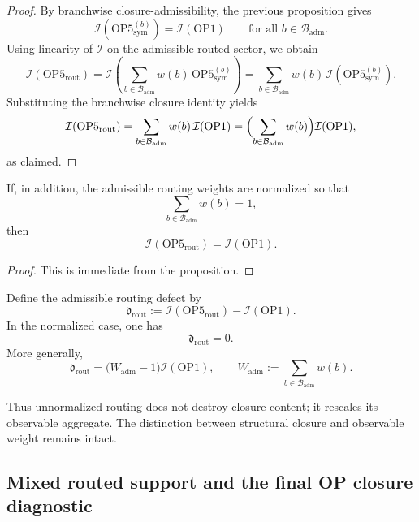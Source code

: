 \begin{proof}
By branchwise closure-admissibility, the previous proposition gives
\[
\mathcal{I}\!\left(\mathrm{OP5}^{(b)}_{\mathrm{sym}}\right)
=
\mathcal{I}(\mathrm{OP1})
\qquad
\text{for all } b\in\mathcal{B}_{\mathrm{adm}}.
\]
Using linearity of $\mathcal{I}$ on the admissible routed sector, we obtain
\[
\mathcal{I}(\mathrm{OP5}_{\mathrm{rout}})
=
\mathcal{I}\!\left(
\sum_{b\in\mathcal{B}_{\mathrm{adm}}} w(b)\,\mathrm{OP5}^{(b)}_{\mathrm{sym}}
\right)
=
\sum_{b\in\mathcal{B}_{\mathrm{adm}}} w(b)\,
\mathcal{I}\!\left(\mathrm{OP5}^{(b)}_{\mathrm{sym}}\right).
\]
Substituting the branchwise closure identity yields
\[
\mathcal{I}(\mathrm{OP5}_{\mathrm{rout}})
=
\sum_{b\in\mathcal{B}_{\mathrm{adm}}} w(b)\,\mathcal{I}(\mathrm{OP1})
=
\Bigl(\sum_{b\in\mathcal{B}_{\mathrm{adm}}} w(b)\Bigr)\mathcal{I}(\mathrm{OP1}),
\]
as claimed.
\end{proof}

\begin{corollary}
If, in addition, the admissible routing weights are normalized so that
\[
\sum_{b\in\mathcal{B}_{\mathrm{adm}}} w(b)=1,
\]
then
\[
\mathcal{I}(\mathrm{OP5}_{\mathrm{rout}})
=
\mathcal{I}(\mathrm{OP1}).
\]
\end{corollary}

\begin{proof}
This is immediate from the proposition.
\end{proof}

\begin{definition}
Define the admissible routing defect by
\[
\mathfrak{d}_{\mathrm{rout}}
:=
\mathcal{I}(\mathrm{OP5}_{\mathrm{rout}})
-
\mathcal{I}(\mathrm{OP1}).
\]
In the normalized case, one has
\[
\mathfrak{d}_{\mathrm{rout}}=0.
\]
More generally,
\[
\mathfrak{d}_{\mathrm{rout}}
=
\bigl(W_{\mathrm{adm}}-1\bigr)\mathcal{I}(\mathrm{OP1}),
\qquad
W_{\mathrm{adm}}:=\sum_{b\in\mathcal{B}_{\mathrm{adm}}} w(b).
\]
\end{definition}

\begin{remark}
Thus unnormalized routing does not destroy closure content; it rescales its observable aggregate. The distinction between structural closure and observable weight remains intact.
\end{remark}

\subsection{Mixed routed support and the final OP closure diagnostic}

